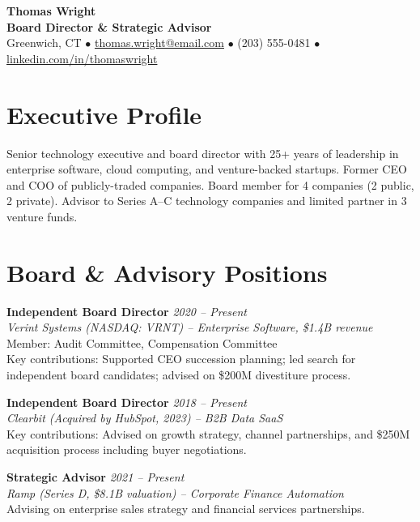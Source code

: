 \documentclass[11pt,a4paper]{article}
\begin{document}
\begin{center}
  {\LARGE \textbf{Thomas Wright}}\\[4pt]
  \textbf{Board Director \& Strategic Advisor}\\[3pt]
  Greenwich, CT \quad$\bullet$\quad
  \href{mailto:thomas.wright@email.com}{thomas.wright@email.com} \quad$\bullet$\quad
  (203) 555-0481 \quad$\bullet$\quad
  \href{https://linkedin.com/in/thomaswright}{linkedin.com/in/thomaswright}
\end{center}

\section{Executive Profile}
Senior technology executive and board director with 25+ years of leadership in enterprise software, cloud computing, and venture-backed startups. Former CEO and COO of publicly-traded companies. Board member for 4 companies (2 public, 2 private). Advisor to Series A--C technology companies and limited partner in 3 venture funds.

\section{Board \& Advisory Positions}

\noindent\textbf{Independent Board Director} \hfill \textit{2020 -- Present}\\
\textit{Verint Systems (NASDAQ: VRNT) -- Enterprise Software, \$1.4B revenue}\\
Member: Audit Committee, Compensation Committee\\
Key contributions: Supported CEO succession planning; led search for independent board candidates; advised on \$200M divestiture process.

\vspace{4pt}
\noindent\textbf{Independent Board Director} \hfill \textit{2018 -- Present}\\
\textit{Clearbit (Acquired by HubSpot, 2023) -- B2B Data SaaS}\\
Key contributions: Advised on growth strategy, channel partnerships, and \$250M acquisition process including buyer negotiations.

\vspace{4pt}
\noindent\textbf{Strategic Advisor} \hfill \textit{2021 -- Present}\\
\textit{Ramp (Series D, \$8.1B valuation) -- Corporate Finance Automation}\\
Advising on enterprise sales strategy and financial services partnerships.
\end{document}
